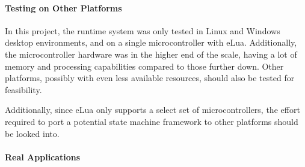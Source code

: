 \paragraph{Testing on Other Platforms} In this project, the runtime system was only tested in Linux and Windows desktop environments, and on a single microcontroller with eLua. Additionally, the microcontroller hardware was in the higher end of the scale, having a lot of memory and processing capabilities compared to those further down. Other platforms, possibly with even less available resources, should also be tested for feasibility.

\noindent
Additionally, since eLua only supports a select set of microcontrollers, the effort required to port a potential state machine framework to other platforms should be looked into.

\paragraph{Real Applications} 